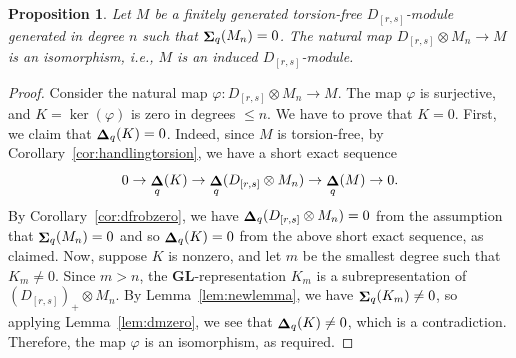 \documentclass[12pt]{amsart}
\renewcommand{\phi}{\varphi}
\DeclareMathOperator{\Sh}{\bf{\Sigma}}
\DeclareMathOperator{\De}{\bf{\Delta}}
\newcommand{\Drs}{D_{[r,s]}}
\newcommand{\mShq}{\Sh_{q}}
\newcommand{\mDeq}{\De_{q}}
\newcommand{\GL}{\mathbf{GL}}
\numberwithin{equation}{section}
\newtheorem{proposition}[equation]{Proposition}
\theoremstyle{definition}
\theoremstyle{plain}
\begin{document}
\begin{proposition}\label{prop:dmzerogenonedeg}
    Let $M$ be a finitely generated torsion-free $\Drs$-module generated in degree $n$ such that $\mShq(M_n) = 0$. The natural map $\Drs \otimes M_n \to M$ is an isomorphism, i.e., $M$ is an induced $\Drs$-module.
\end{proposition}
\begin{proof}
    Consider the natural map $\phi \colon \Drs \otimes M_n \to M$. The map $\phi$ is surjective, and $K = \ker(\phi)$ is zero in degrees $\le n$. We have to prove that $K = 0$. First, we claim that $\mDeq(K) = 0$. Indeed, since $M$ is torsion-free, by Corollary~\ref{cor:handlingtorsion}, we have a short exact sequence 
     \begin{displaymath}
    0 \to \mDeq(K) \to \mDeq(\Drs \otimes M_n) \to \mDeq(M) \to 0.
    \end{displaymath} 
    By Corollary~\ref{cor:dfrobzero}, we have $\mDeq(\Drs \otimes M_n) = 0$ from the assumption that $\mShq(M_n)= 0$ and so $\mDeq(K) = 0$ from the above short exact sequence, as claimed. 
    Now, suppose $K$ is nonzero, and let $m$ be the smallest degree such that $K_m \ne 0$. Since $m > n$, the $\GL$-representation $K_m$ is a subrepresentation of $({\Drs})_{+} \otimes M_n$. 
    By Lemma~\ref{lem:newlemma}, we have $\mShq(K_m) \ne 0$, so 
    applying Lemma~\ref{lem:dmzero}, we see that $\mDeq(K) \ne 0$, which is a contradiction. Therefore, the map $\phi$ is an isomorphism, as required.
\end{proof}
\end{document}
